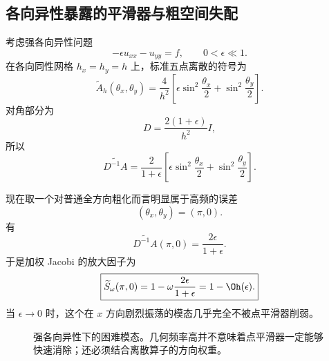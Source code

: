 \subsection{各向异性暴露的平滑器与粗空间失配}

考虑强各向异性问题
\begin{equation}
-\epsilon u_{xx}-u_{yy}=f,
\qquad
0<\epsilon\ll1.
\label{eq:lfa-anisotropic-model}
\end{equation}
在各向同性网格 $h_x=h_y=h$ 上，标准五点离散的符号为
\begin{equation}
\boxed{
\widetilde A_h(\theta_x,\theta_y)
=
\frac4{h^2}
\left[
\epsilon\sin^2\frac{\theta_x}{2}
+
\sin^2\frac{\theta_y}{2}
\right].
}
\label{eq:lfa-anisotropic-symbol}
\end{equation}
对角部分为
\begin{equation}
D=\frac{2(1+\epsilon)}{h^2}I,
\end{equation}
所以
\begin{equation}
\widetilde{D^{-1}A}
=
\frac{2}{1+\epsilon}
\left[
\epsilon\sin^2\frac{\theta_x}{2}
+
\sin^2\frac{\theta_y}{2}
\right].
\label{eq:lfa-anisotropic-dinv-a}
\end{equation}

现在取一个对普通全方向粗化而言明显属于高频的误差
\begin{equation}
(\theta_x,\theta_y)=(\pi,0).
\end{equation}
有
\begin{equation}
\widetilde{D^{-1}A}(\pi,0)
=
\frac{2\epsilon}{1+\epsilon}.
\end{equation}
于是加权 Jacobi 的放大因子为
\begin{equation}
\boxed{
\widetilde S_\omega(\pi,0)
=
1-\omega\frac{2\epsilon}{1+\epsilon}
=
1-\Oh(\epsilon).
}
\label{eq:lfa-anisotropic-bad-mode}
\end{equation}
当 $\epsilon\rightarrow0$ 时，这个在 $x$ 方向剧烈振荡的模态几乎完全不被点平滑器削弱。

\begin{figure}[htbp]
\centering
{}
\caption{强各向异性下的困难模态。几何频率高并不意味着点平滑器一定能够快速消除；还必须结合离散算子的方向权重。}
\label{fig:lfa-anisotropic-difficult-mode}
\end{figure}

